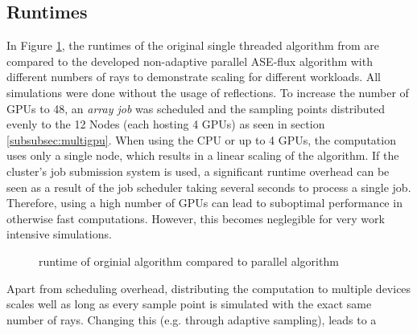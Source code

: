 \subsection{Runtimes}
In Figure \ref{plot:runtime}, the runtimes of the original single threaded
algorithm from \cite{ASE2010} are compared to the developed non-adaptive
parallel ASE-flux algorithm with different numbers of rays to demonstrate
scaling for different workloads. All simulations were done without the usage of
reflections. To increase the number of GPUs to 48, an \emph{array job} was
scheduled and the sampling points distributed evenly to the 12 Nodes (each
hosting 4 GPUs) as seen in section \ref{subsubsec:multigpu}. When using the CPU
or up to 4 GPUs, the computation uses only a single node, which results in a
linear scaling of the algorithm. If the cluster's job submission system is used,
a significant runtime overhead can be seen as a result of the job scheduler
taking several seconds to process a single job. Therefore, using a high number
of GPUs can lead to suboptimal performance in otherwise fast computations.
However, this becomes neglegible for very work intensive simulations.
\begin{figure}[H]
  \centerline{
    }
  \caption{runtime of orginial algorithm compared to parallel algorithm}
  \label{plot:runtime}
\end{figure}
Apart from scheduling overhead, distributing the computation to multiple devices
scales well as long as every sample point is simulated with the exact same
number of rays. Changing this (e.g. through adaptive sampling), leads to a
